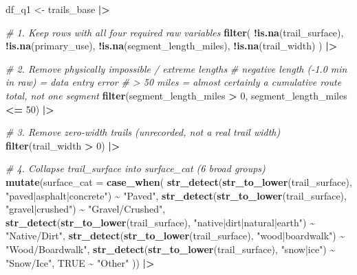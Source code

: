 \documentclass[
]{article}
\newenvironment{Shaded}{\begin{snugshade}}{\end{snugshade}}
\newcommand{\AttributeTok}[1]{\textcolor[rgb]{0.13,0.29,0.53}{#1}}
\newcommand{\CommentTok}[1]{\textcolor[rgb]{0.56,0.35,0.01}{\textit{#1}}}
\newcommand{\ConstantTok}[1]{\textcolor[rgb]{0.56,0.35,0.01}{#1}}
\newcommand{\DecValTok}[1]{\textcolor[rgb]{0.00,0.00,0.81}{#1}}
\newcommand{\FunctionTok}[1]{\textcolor[rgb]{0.13,0.29,0.53}{\textbf{#1}}}
\newcommand{\NormalTok}[1]{#1}
\newcommand{\OtherTok}[1]{\textcolor[rgb]{0.56,0.35,0.01}{#1}}
\newcommand{\SpecialCharTok}[1]{\textcolor[rgb]{0.81,0.36,0.00}{\textbf{#1}}}
\newcommand{\StringTok}[1]{\textcolor[rgb]{0.31,0.60,0.02}{#1}}
\begin{document}
\begin{Shaded}
\begin{Highlighting}[]
\NormalTok{df\_q1 }\OtherTok{\textless{}{-}}\NormalTok{ trails\_base }\SpecialCharTok{|\textgreater{}}
  
  \CommentTok{\# 1. Keep rows with all four required raw variables}
  \FunctionTok{filter}\NormalTok{(}
    \SpecialCharTok{!}\FunctionTok{is.na}\NormalTok{(trail\_surface),}
    \SpecialCharTok{!}\FunctionTok{is.na}\NormalTok{(primary\_use),}
    \SpecialCharTok{!}\FunctionTok{is.na}\NormalTok{(segment\_length\_miles),}
    \SpecialCharTok{!}\FunctionTok{is.na}\NormalTok{(trail\_width)}
\NormalTok{  ) }\SpecialCharTok{|\textgreater{}}
  
  \CommentTok{\# 2. Remove physically impossible / extreme lengths}
  \CommentTok{\#    negative length ({-}1.0 min in raw) = data entry error}
  \CommentTok{\#    \textgreater{} 50 miles = almost certainly a cumulative route total, not one segment}
  \FunctionTok{filter}\NormalTok{(segment\_length\_miles }\SpecialCharTok{\textgreater{}} \DecValTok{0}\NormalTok{, segment\_length\_miles }\SpecialCharTok{\textless{}=} \DecValTok{50}\NormalTok{) }\SpecialCharTok{|\textgreater{}}
  
  \CommentTok{\# 3. Remove zero{-}width trails (unrecorded, not a real trail width)}
  \FunctionTok{filter}\NormalTok{(trail\_width }\SpecialCharTok{\textgreater{}} \DecValTok{0}\NormalTok{) }\SpecialCharTok{|\textgreater{}}
  
  \CommentTok{\# 4. Collapse trail\_surface into surface\_cat (6 broad groups)}
  \FunctionTok{mutate}\NormalTok{(}\AttributeTok{surface\_cat =} \FunctionTok{case\_when}\NormalTok{(}
    \FunctionTok{str\_detect}\NormalTok{(}\FunctionTok{str\_to\_lower}\NormalTok{(trail\_surface), }\StringTok{"paved|asphalt|concrete"}\NormalTok{)    }\SpecialCharTok{\textasciitilde{}} \StringTok{"Paved"}\NormalTok{,}
    \FunctionTok{str\_detect}\NormalTok{(}\FunctionTok{str\_to\_lower}\NormalTok{(trail\_surface), }\StringTok{"gravel|crushed"}\NormalTok{)            }\SpecialCharTok{\textasciitilde{}} \StringTok{"Gravel/Crushed"}\NormalTok{,}
    \FunctionTok{str\_detect}\NormalTok{(}\FunctionTok{str\_to\_lower}\NormalTok{(trail\_surface), }\StringTok{"native|dirt|natural|earth"}\NormalTok{) }\SpecialCharTok{\textasciitilde{}} \StringTok{"Native/Dirt"}\NormalTok{,}
    \FunctionTok{str\_detect}\NormalTok{(}\FunctionTok{str\_to\_lower}\NormalTok{(trail\_surface), }\StringTok{"wood|boardwalk"}\NormalTok{)            }\SpecialCharTok{\textasciitilde{}} \StringTok{"Wood/Boardwalk"}\NormalTok{,}
    \FunctionTok{str\_detect}\NormalTok{(}\FunctionTok{str\_to\_lower}\NormalTok{(trail\_surface), }\StringTok{"snow|ice"}\NormalTok{)                  }\SpecialCharTok{\textasciitilde{}} \StringTok{"Snow/Ice"}\NormalTok{,}
    \ConstantTok{TRUE}                                                                  \SpecialCharTok{\textasciitilde{}} \StringTok{"Other"}
\NormalTok{  )) }\SpecialCharTok{|\textgreater{}}
  

\end{Highlighting}
\end{Shaded}
\end{document}
